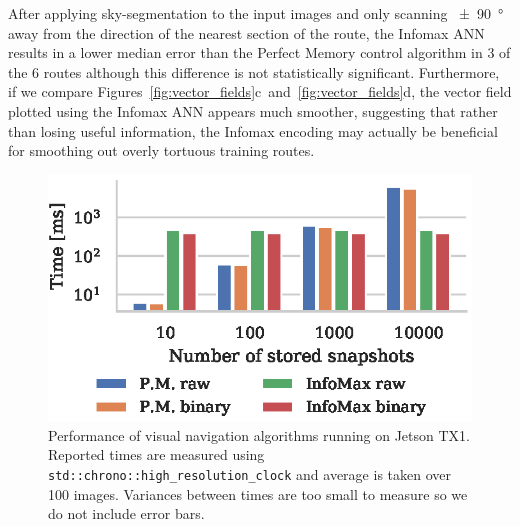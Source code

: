\documentclass[letterpaper]{article}
\begin{document}
After applying sky-segmentation to the input images and only scanning \SI{\pm 90}{\degree} away from the direction of the nearest section of the route, the Infomax ANN results in a lower median error than the Perfect Memory control algorithm in 3 of the 6 routes although this difference is not statistically significant.
Furthermore, if we compare Figures~\ref{fig:vector_fields}c~and~\ref{fig:vector_fields}d, the vector field plotted using the Infomax ANN appears much smoother, suggesting that rather than losing useful information, the Infomax encoding may actually be beneficial for smoothing out overly tortuous training routes.

\begin{figure}[t]
    \centering
    \includegraphics{figures/jetson_test_performance.eps}
    \caption{Performance of visual navigation algorithms running on Jetson TX1. 
    Reported times are measured using \lstinline{std::chrono::high_resolution_clock} and average is taken over \num{100} images.
    Variances between times are too small to measure so we do not include error bars.}
    \label{fig:jetson_test_performance}
\end{figure}
\end{document}
